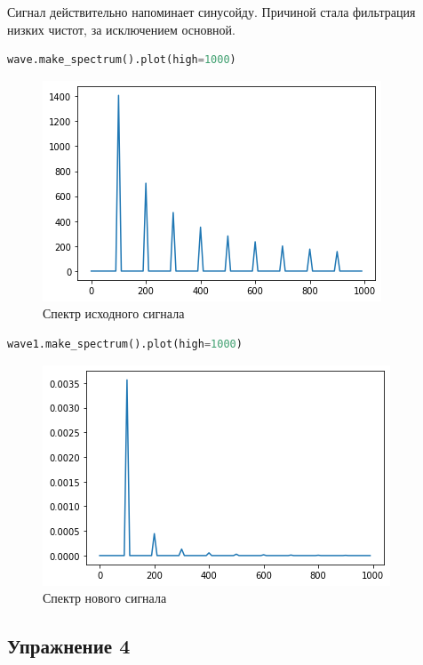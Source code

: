 Сигнал действительно напоминает синусойду. Причиной стала фильтрация низких чистот, за исключением основной.

\begin{lstlisting}[language=Python]
wave.make_spectrum().plot(high=1000)
\end{lstlisting}
\begin{figure}[H]
	\begin{center}
		\includegraphics[scale=1]{fig/lab09/lab09_24_0.png}
		\caption{Спектр исходного сигнала}
	\end{center}
\end{figure}

\begin{lstlisting}[language=Python]
wave1.make_spectrum().plot(high=1000)
\end{lstlisting}
\begin{figure}[H]
	\begin{center}
		\includegraphics[scale=1]{fig/lab09/lab09_25_0.png}
		\caption{Спектр нового сигнала}
	\end{center}
\end{figure}


\subsection{Упражнение 4}

